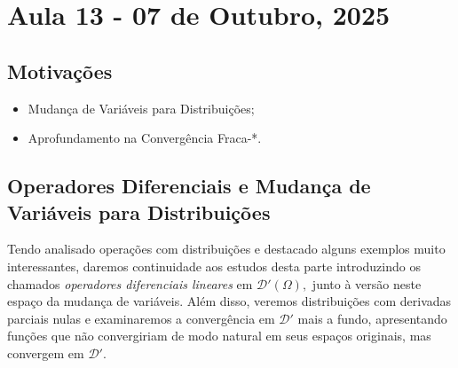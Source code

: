 \documentclass[../distribution_theory_notes.tex]{subfiles}
\begin{document}
\section{Aula 13 - 07 de Outubro, 2025}
\subsection{Motivações}
\begin{itemize}
 \item Mudança de Variáveis para Distribuições;
 \item Aprofundamento na Convergência Fraca-*.
\end{itemize}
\subsection{Operadores Diferenciais e Mudança de Variáveis para Distribuições}
 Tendo analisado operações com distribuições e destacado alguns exemplos muito interessantes, daremos continuidade aos estudos desta parte introduzindo os chamados \textit{operadores diferenciais lineares} em \(\mathcal{D}'(\Omega ),\) junto à versão neste espaço da mudança de variáveis. Além disso, veremos distribuições com derivadas 
 parciais nulas e examinaremos a convergência em \(\mathcal{D}'\) mais a fundo, apresentando funções que não convergiriam de modo natural em seus espaços originais, mas convergem em \(\mathcal{D}'.\)
\end{document}

